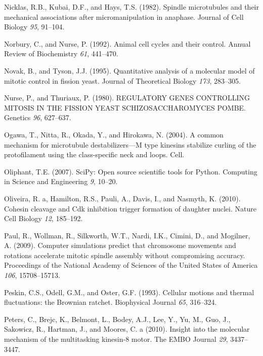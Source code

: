 \documentclass[12pt,a4paper,twoside,openright]{book}
\begin{document}
Nicklas, R.B., Kubai, D.F., and Hays, T.S. (1982). Spindle microtubules
and their mechanical associations after micromanipulation in anaphase.
Journal of Cell Biology \emph{95}, 91--104.

Norbury, C., and Nurse, P. (1992). Animal cell cycles and their control.
Annual Review of Biochemistry \emph{61}, 441--470.

Novak, B., and Tyson, J.J. (1995). Quantitative analysis of a molecular
model of mitotic control in fission yeast. Journal of Theoretical
Biology \emph{173}, 283--305.

Nurse, P., and Thuriaux, P. (1980). REGULATORY GENES CONTROLLING MITOSIS
IN THE FISSION YEAST SCHIZOSACCHAROMYCES POMBE. Genetics \emph{96},
627--637.

Ogawa, T., Nitta, R., Okada, Y., and Hirokawa, N. (2004). A common
mechanism for microtubule destabilizers---M type kinesins stabilize
curling of the protofilament using the class-specific neck and loops.
Cell.

Oliphant, T.E. (2007). SciPy: Open source scientific tools for Python.
Computing in Science and Engineering \emph{9}, 10--20.

Oliveira, R. a, Hamilton, R.S., Pauli, A., Davis, I., and Nasmyth, K.
(2010). Cohesin cleavage and Cdk inhibition trigger formation of
daughter nuclei. Nature Cell Biology \emph{12}, 185--192.

Paul, R., Wollman, R., Silkworth, W.T., Nardi, I.K., Cimini, D., and
Mogilner, A. (2009). Computer simulations predict that chromosome
movements and rotations accelerate mitotic spindle assembly without
compromising accuracy. Proceedings of the National Academy of Sciences
of the United States of America \emph{106}, 15708--15713.

Peskin, C.S., Odell, G.M., and Oster, G.F. (1993). Cellular motions and
thermal fluctuations: the Brownian ratchet. Biophysical Journal
\emph{65}, 316--324.

Peters, C., Brejc, K., Belmont, L., Bodey, A.J., Lee, Y., Yu, M., Guo,
J., Sakowicz, R., Hartman, J., and Moores, C. a (2010). Insight into the
molecular mechanism of the multitasking kinesin-8 motor. The EMBO
Journal \emph{29}, 3437--3447.
\end{document}
